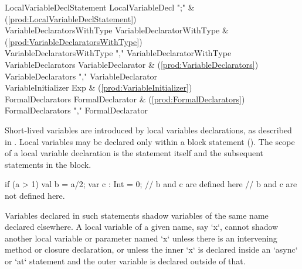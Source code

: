 \begin{bbgrammar}
LocalVariableDeclStatement \: LocalVariableDecl \xcd";" & (\ref{prod:LocalVariableDeclStatement}) \\
VariableDeclaratorsWithType \: VariableDeclaratorWithType & (\ref{prod:VariableDeclaratorsWithType}) \\
                    \| VariableDeclaratorsWithType \xcd"," VariableDeclaratorWithType \\
 VariableDeclarators \: VariableDeclarator & (\ref{prod:VariableDeclarators}) \\
                    \| VariableDeclarators \xcd"," VariableDeclarator \\
 VariableInitializer \: Exp & (\ref{prod:VariableInitializer}) \\
   FormalDeclarators \: FormalDeclarator & (\ref{prod:FormalDeclarators}) \\
                    \| FormalDeclarators \xcd"," FormalDeclarator \\
\end{bbgrammar}

Short-lived variables are introduced by local variables declarations, as
described in . Local variables may be declared only
within a block statement (). The scope of a local variable
declaration is the statement itself and the subsequent statements in the
block. 
\begin{xten}
  if (a > 1) {
     val b = a/2;
     var c : Int = 0;
     // b and c are defined here
  }
  // b and c are not defined here.
\end{xten}

Variables declared in such statements shadow variables of the same
name declared elsewhere.
A local variable of a given name, say \xcd`x`, cannot shadow another local
variable or parameter named \xcd`x` unless there is an intervening method or
closure declaration, or unless the inner \xcd`x` is declared inside an
\xcd`async` or \xcd`at` statement and the outer variable is declared outside
of that. 

